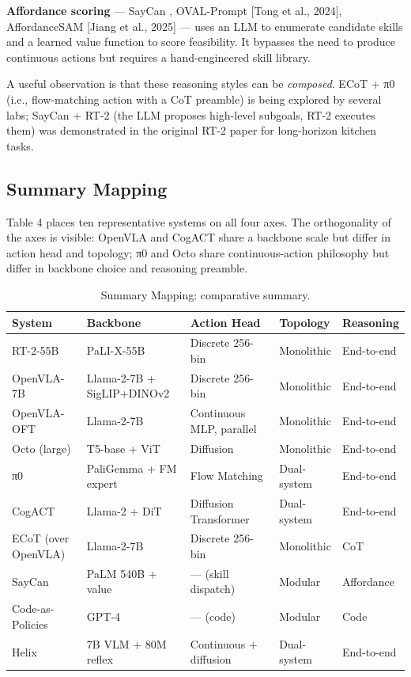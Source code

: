\documentclass{article}
\begin{document}
\textbf{Affordance scoring} --- SayCan \cite{ahn2022doasicannotasisayg}, OVAL-Prompt {[}Tong et al., 2024{]}, AffordanceSAM {[}Jiang et al., 2025{]} --- uses an LLM to enumerate candidate skills and a learned value function to score feasibility. It bypasses the need to produce continuous actions but requires a hand-engineered skill library.

A useful observation is that these reasoning styles can be \emph{composed}. ECoT + π0 (i.e., flow-matching action with a CoT preamble) is being explored by several labs; SayCan + RT-2 (the LLM proposes high-level subgoals, RT-2 executes them) was demonstrated in the original RT-2 paper for long-horizon kitchen tasks.

\subsection{Summary Mapping}\label{summary-mapping}

Table 4 places ten representative systems on all four axes. The orthogonality of the axes is visible: OpenVLA and CogACT share a backbone scale but differ in action head and topology; π0 and Octo share continuous-action philosophy but differ in backbone choice and reasoning preamble.

\begin{table}[t]
\centering
\caption{Summary Mapping: comparative summary.}
\label{tab:summary-mapping}
\begin{tabular}{>{\raggedright\arraybackslash}p{0.2111\linewidth}
  >{\raggedright\arraybackslash}p{0.2889\linewidth}
  >{\raggedright\arraybackslash}p{0.2667\linewidth}
  >{\raggedright\arraybackslash}p{0.1222\linewidth}
  >{\raggedright\arraybackslash}p{0.1111\linewidth}}
\toprule
System & Backbone & Action Head & Topology & Reasoning \\
\midrule
RT-2-55B & PaLI-X-55B & Discrete 256-bin & Monolithic & End-to-end \\
OpenVLA-7B & Llama-2-7B + SigLIP+DINOv2 & Discrete 256-bin & Monolithic & End-to-end \\
OpenVLA-OFT & Llama-2-7B & Continuous MLP, parallel & Monolithic & End-to-end \\
Octo (large) & T5-base + ViT & Diffusion & Monolithic & End-to-end \\
π0 & PaliGemma + FM expert & Flow Matching & Dual-system & End-to-end \\
CogACT & Llama-2 + DiT & Diffusion Transformer & Dual-system & End-to-end \\
ECoT (over OpenVLA) & Llama-2-7B & Discrete 256-bin & Monolithic & CoT \\
SayCan & PaLM 540B + value & --- (skill dispatch) & Modular & Affordance \\
Code-as-Policies & GPT-4 & --- (code) & Modular & Code \\
Helix & 7B VLM + 80M reflex & Continuous + diffusion & Dual-system & End-to-end \\
\end{tabular}
\end{table}
\end{document}
